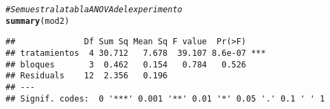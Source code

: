 \documentclass[10pt,a4paper]{article}\usepackage[]{graphicx}\usepackage[]{color}
\makeatletter
\newcommand{\hlcom}[1]{\textcolor[rgb]{0.678,0.584,0.686}{\textit{#1}}}%
\newcommand{\hlstd}[1]{\textcolor[rgb]{0.345,0.345,0.345}{#1}}%
\newcommand{\hlkwd}[1]{\textcolor[rgb]{0.737,0.353,0.396}{\textbf{#1}}}%
\newenvironment{kframe}{%
 \def\at@end@of@kframe{}%
 \ifinner\ifhmode%
  \def\at@end@of@kframe{\end{minipage}}%
  \begin{minipage}{\columnwidth}%
 \fi\fi%
 \def\FrameCommand##1{\hskip\@totalleftmargin \hskip-\fboxsep
 \colorbox{shadecolor}{##1}\hskip-\fboxsep
     \hskip-\linewidth \hskip-\@totalleftmargin \hskip\columnwidth}%
 \MakeFramed {\advance\hsize-\width
   \@totalleftmargin\z@ \linewidth\hsize
   \@setminipage}}%
 {\par\unskip\endMakeFramed%
 \at@end@of@kframe}
\newenvironment{knitrout}{}{} %
\makeatother
\begin{document}
\begin{knitrout}
\begin{kframe}
\begin{alltt}
\hlcom{# Se muestra la tabla ANOVA del experimento }
\hlkwd{summary}\hlstd{(mod2)}
\end{alltt}
\begin{verbatim}
##              Df Sum Sq Mean Sq F value  Pr(>F)    
## tratamientos  4 30.712   7.678  39.107 8.6e-07 ***
## bloques       3  0.462   0.154   0.784   0.526    
## Residuals    12  2.356   0.196                    
## ---
## Signif. codes:  0 '***' 0.001 '**' 0.01 '*' 0.05 '.' 0.1 ' ' 1
\end{verbatim}
\end{kframe}
\end{knitrout}
\end{document}
